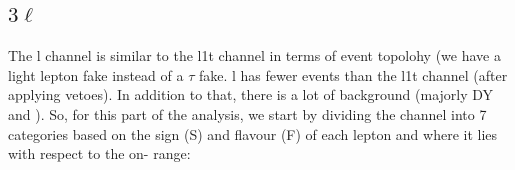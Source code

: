 \documentclass[letterpaper,12pt]{article}
\begin{document}
\begin{table}[h]
  \centering
  \large
  \setlength{\tabcolsep}{20pt}
  \renewcommand{\arraystretch}{2}
  \caption{Summary table for \2l1t{} channel.}
  \label{tab:2l1t}
\end{table}

\subsection{\Large{\boldmath$3\ell$}}
\label{sec:3l}

The \3l channel is similar to the \2l1t{} channel in terms of event topolohy (we have a light lepton fake instead of a $\tau$ fake. \3l{} has fewer events than the \2l1t channel (after applying vetoes). In addition to that, there is a lot of background (majorly DY and \WZ). So, for this part of the analysis, we start by dividing the channel into 7 categories based on the sign (S) and flavour (F) of each lepton and where it lies with respect to the on-\Zboson{} range:
\end{document}
